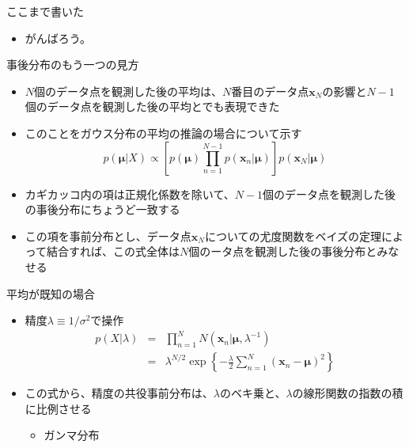 \begin{frame}{ここまで書いた}
 \begin{itemize}
  \item がんばろう。
 \end{itemize}
\end{frame}

\begin{frame}{事後分布のもう一つの見方}
 \begin{itemize}
  \item $N$個のデータ点を観測した後の平均は、$N$番目のデータ点$\bm{x}_N$の影響と$N-1$個のデータ点を観測した後の平均とでも表現できた
  \item このことをガウス分布の平均の推論の場合について示す
        \begin{equation}
         p(\bm{\mu}|X) \propto \left[p(\bm{\mu})\prod_{n=1}^{N-1}p(\bm{x}_n|\bm{\mu})\right]p(\bm{x}_N|\bm{\mu})
        \end{equation}
  \item カギカッコ内の項は正規化係数を除いて、$N-1$個のデータ点を観測した後の事後分布にちょうど一致する
  \item この項を事前分布とし、データ点$\bm{x}_N$についての尤度関数をベイズの定理によって結合すれば、この式全体は$N$個のータ点を観測した後の事後分布とみなせる
 \end{itemize}
\end{frame}

\begin{frame}{平均が既知の場合}
 \begin{itemize}
  \item 精度$\lambda\equiv 1/\sigma^2$で操作
        \begin{eqnarray}
         p(X|\lambda) &=& \prod_{n=1}^{N}N(\bm{x}_n|\bm{\mu},\lambda^{-1}) \nonumber \\
         &=& \lambda^{N/2}\exp\left\{-\frac{\lambda}{2}\sum_{n=1}^{N}(\bm{x}_n-\bm{\mu})^2\right\}\label{114403_19Nov14}
        \end{eqnarray}
  \item この式から、精度の共役事前分布は、$\lambda$のベキ乗と、$\lambda$の線形関数の指数の積に比例させる
        \begin{itemize}
         \item \alert{ガンマ分布}
        \end{itemize}
 \end{itemize}
\end{frame}


